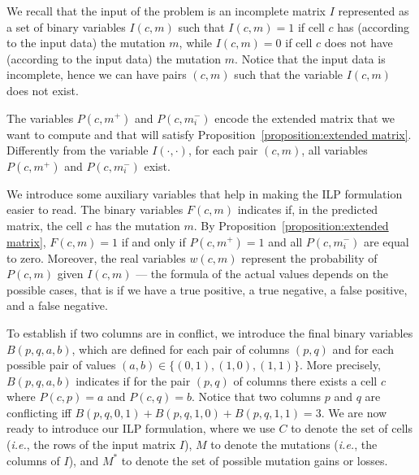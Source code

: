 \documentclass[a4paper,USenglish]{article}
\newcommand{\ie}{\emph{i.e.}}
\theoremstyle{definition}
\begin{document}
We recall that the input of the problem is an incomplete matrix $I$
represented as a set of binary variables $I(c,m)$ such that $I(c,m)=1$
if cell $c$ has (according to the input data) the mutation $m$, while
$I(c,m)=0$ if cell $c$ does not have (according to the input data) the
mutation $m$.
%
Notice that the input data is incomplete, hence we can have pairs
$(c,m)$ such that the variable $I(c,m)$ does not exist.

The variables $P(c,m^{+})$ and $P(c,m_{i}^{-})$ encode the extended
matrix that we want to compute and that will satisfy
Proposition~\ref{proposition:extended matrix}.  Differently from the
variable $I(\cdot,\cdot)$, for each pair $(c,m)$, all variables
$P(c,m^{+})$ and $P(c,m_{i}^{-})$ exist.

We introduce some auxiliary variables that help in making the ILP
formulation easier to read.  The binary variables $F(c,m)$ indicates
if, in the predicted matrix, the cell $c$ has the mutation $m$.  By
Proposition~\ref{proposition:extended matrix}, $F(c,m)=1$ if and only
if $P(c,m^{+})=1$ and all $P(c,m_{i}^{-})$ are equal to zero.
Moreover, the real variables $w(c,m)$ represent the probability of
$P(c,m)$ given $I(c,m)$ --- the formula of the actual values depends
on the possible cases, that is if we have a true positive, a true
negative, a false positive, and a false negative.

To establish if two columns are in conflict, we introduce the final
binary variables $B(p,q,a,b)$, which are defined for each pair of
columns $(p,q)$ and for each possible pair of values
$(a,b)\in \{(0,1), (1,0), (1,1)\}$.  More precisely, $B(p,q,a,b)$
indicates if for the pair $(p,q)$ of columns there exists a cell $c$
where $P(c,p)=a$ and $P(c,q)=b$.  Notice that two columns $p$ and $q$
are conflicting iff $B(p,q,0,1) + B(p,q,1,0) + B(p,q,1,1) = 3$.  We
are now ready to introduce our ILP formulation, where we use $C$ to
denote the set of cells (\ie, the rows of the input matrix $I$), $M$
to denote the mutations (\ie, the columns of $I$), and $M^{*}$ to
denote the set of possible mutation gains or losses.
\end{document}
